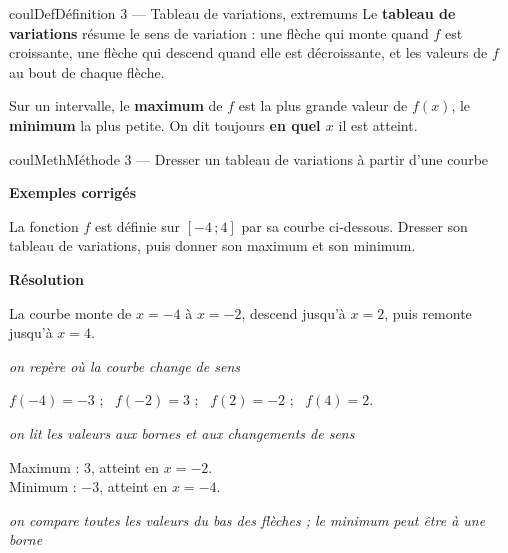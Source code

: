 \documentclass[11pt,a4paper]{article}
\makeatletter
\newcommand{\lycee@repere}[4]{%
  \draw[grille,step=1] (#1,#2) grid (#3,#4);
  \draw[-{Stealth[length=2mm]},thick] (#1,0)--({#3+0.4},0) node[below left=-1pt]{$x$};
  \draw[-{Stealth[length=2mm]},thick] (0,#2)--(0,{#4+0.4}) node[below left=-1pt]{$y$};
  \node[below left,font=\scriptsize,inner sep=1.5pt] at (0,0) {$0$};}
\newcommand{\lycee@gradx}[1]{\foreach \k/\l in {#1}{%
  \draw (\k,0.07)--(\k,-0.07) node[below,font=\scriptsize,inner sep=1.5pt]{$\l$};}}
\newcommand{\lycee@grady}[1]{\foreach \k/\l in {#1}{%
  \draw (0.07,\k)--(-0.07,\k) node[left,font=\scriptsize,inner sep=1.5pt]{$\l$};}}
\newcommand{\lycee@intff}[2]{\left[#1\,;#2\right]}
\providecommand{\repere}{\lycee@repere}%
\providecommand{\gradx}{\lycee@gradx}%
\providecommand{\grady}{\lycee@grady}%
\providecommand{\Cf}{\mathcal{C}\sb{f}}%
\providecommand{\intff}{\lycee@intff}%
\newcounter{lycee@signet}
\newcommand{\signet}[3][]{\stepcounter{lycee@signet}%
  \edef\lycee@dest{\if\relax\detokenize{#1}\relax
    signet.\arabic{lycee@signet}\else#1\fi}%
  \hypertarget{\lycee@dest}{}\bookmark[level=#2,dest=\lycee@dest]{#3}}
\newcommand{\res}[1]{#1}
\newcounter{methode}
\newenvironment{definitionbox}[1][Définition]%
  {\begin{boitecours}[phantom={\signet{2}{#1}}]{coulDef}{#1}}{\end{boitecours}}
\newenvironment{methodebox}[1][Méthode]{\stepcounter{methode}%
  \begin{boitecours}[phantom={\signet[methode-\arabic{methode}]{2}{#1}}]{coulMeth}{#1}}%
  {\end{boitecours}}
\newcommand{\etape}[1]{\par\smallskip\textbf{\color{coulMeth}#1}\par\nobreak\smallskip}
\newcommand{\explique}[2]{\par\smallskip\noindent
  \begin{minipage}[t]{0.57\linewidth}\raggedright #1\end{minipage}\hfill
  \begin{minipage}[t]{0.40\linewidth}\raggedright\leavevmode
    {\small\itshape\color{black!60}#2}\end{minipage}\par}
\newcommand{\cas}[1]{\par\smallskip\noindent\textbf{\color{coulExo}#1}\vadjust{\nobreak}}
\newenvironment{correction}{\par}{\par}
\newcommand{\etapeexemples}{\etape{Exemples corrigés}}
\makeatother
\begin{document}
\begin{definitionbox}[Définition 3 --- Tableau de variations, extremums]
Le \textbf{tableau de variations} résume le sens de variation : une flèche qui monte
quand $f$ est croissante, une flèche qui descend quand elle est décroissante, et les
valeurs de $f$ au bout de chaque flèche.

\smallskip
Sur un intervalle, le \textbf{maximum} de $f$ est la plus grande valeur de $f(x)$, le
\textbf{minimum} la plus petite. On dit toujours \textbf{en quel $x$} il est atteint.
\end{definitionbox}

\begin{methodebox}[Méthode 3 --- Dresser un tableau de variations à partir d'une courbe]
\etapeexemples
La fonction $f$ est définie sur $\intff{-4}{4}$ par sa courbe ci-dessous. Dresser son
tableau de variations, puis donner son maximum et son minimum.
\begin{center}
\end{center}
\begin{correction}
\cas{Résolution}\par\nopagebreak
\explique{La courbe monte de $x=-4$ à $x=-2$, descend jusqu'à $x=2$, puis remonte
jusqu'à $x=4$.}{on repère où la courbe change de sens}
\explique{$f(-4)=-3$ ; \ $f(-2)=3$ ; \ $f(2)=-2$ ; \ $f(4)=2$.}{on lit les valeurs aux
bornes et aux changements de sens}
\begin{center}
\end{center}
\explique{Maximum : \res{$3$, atteint en $x=-2$}. \\ Minimum : \res{$-3$, atteint en $x=-4$}.}{on
compare toutes les valeurs du bas des flèches ; le minimum peut être à une borne}
\end{correction}


\end{methodebox}
\end{document}
